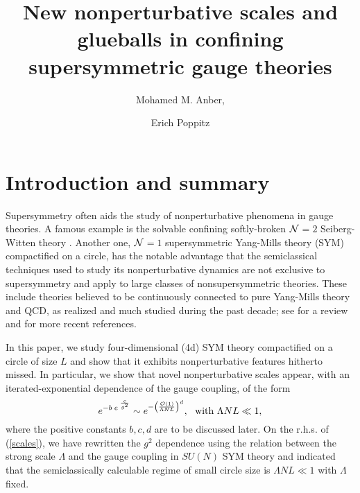 \documentclass[11pt]{article}
\title{New nonperturbative scales and glueballs in confining  supersymmetric gauge theories
}
\author[a] {Mohamed M. Anber,}
\author[b] {Erich Poppitz}
\affiliation[a] {Department of Physics, Lewis \& Clark College, Portland, OR 97219, USA}
\affiliation[b] {Department of Physics, University of Toronto, Toronto, ON M5S 1A7, Canada}
\begin{document}
\maketitle

\section{Introduction and summary}

Supersymmetry often aids the study of nonperturbative phenomena in  gauge theories. A famous example is the  solvable confining softly-broken ${\cal N}$$=$$2$ Seiberg-Witten theory \cite{Seiberg:1994rs,Seiberg:1994aj}.  Another one,  ${\cal N}$$=$$1$ supersymmetric Yang-Mills theory (SYM) compactified on a circle, has the notable advantage that the semiclassical techniques used to study its nonperturbative dynamics  are not exclusive to supersymmetry and apply to large classes of nonsupersymmetric theories. These  include theories believed to be continuously connected to pure Yang-Mills theory and QCD, as realized and much studied during the past decade; see \cite{Dunne:2016nmc} for a review and \cite{Bhoonah:2014gpa,Anber:2015kea,Anber:2015wha,Cherman:2016hcd,Cherman:2016jtu,Cherman:2017tey,Aitken:2017ayq,Anber:2017pak,Poppitz:2017ivi,Anber:2017rch,Anber:2017tug,Tanizaki:2017qhf} for more recent references.

In this paper, we study four-dimensional  (4d) SYM theory compactified on a circle of size $L$ and show that it exhibits nonperturbative features hitherto missed. In particular, we show that novel nonperturbative scales appear, with an iterated-exponential dependence of the gauge coupling, of the form\begin{equation}
\label{scales}
e^{- b\; e^{\;{c \over   g^2}}} \sim e^{-  \left({{\cal{O}}(1) \over \Lambda N L}\right)^d}, ~~{\rm with} ~ \Lambda N L \ll 1,
\end{equation} 
where the positive constants $b, c, d$ are to be discussed later. On the r.h.s. of (\ref{scales}), we have  rewritten the $g^2$ dependence using the relation between the strong scale $\Lambda$ and the gauge coupling in $SU(N)$ SYM theory and indicated that the semiclassically calculable regime of small circle size is $\Lambda N L \ll 1$ with  $\Lambda$ fixed.
\end{document}

